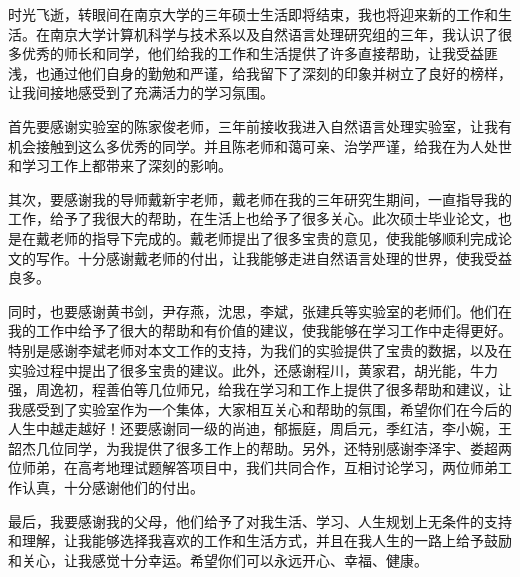 \documentclass[master, winfont]{njuthesis}
\begin{document}
\nocite{*}

%
%
\begin{acknowledgement}
  时光飞逝，转眼间在南京大学的三年硕士生活即将结束，我也将迎来新的工作和生活。在南京大学计算机科学与技术系以及自然语言处理研究组的三年，我认识了很多优秀的师长和同学，他们给我的工作和生活提供了许多直接帮助，让我受益匪浅，也通过他们自身的勤勉和严谨，给我留下了深刻的印象并树立了良好的榜样，让我间接地感受到了充满活力的学习氛围。

  首先要感谢实验室的陈家俊老师，三年前接收我进入自然语言处理实验室，让我有机会接触到这么多优秀的同学。并且陈老师和蔼可亲、治学严谨，给我在为人处世和学习工作上都带来了深刻的影响。
  
  其次，要感谢我的导师戴新宇老师，戴老师在我的三年研究生期间，一直指导我的工作，给予了我很大的帮助，在生活上也给予了很多关心。此次硕士毕业论文，也是在戴老师的指导下完成的。戴老师提出了很多宝贵的意见，使我能够顺利完成论文的写作。十分感谢戴老师的付出，让我能够走进自然语言处理的世界，使我受益良多。

  同时，也要感谢黄书剑，尹存燕，沈思，李斌，张建兵等实验室的老师们。他们在我的工作中给予了很大的帮助和有价值的建议，使我能够在学习工作中走得更好。特别是感谢李斌老师对本文工作的支持，为我们的实验提供了宝贵的数据，以及在实验过程中提出了很多宝贵的建议。此外，还感谢程川，黄家君，胡光能，牛力强，周逸初，程善伯等几位师兄，给我在学习和工作上提供了很多帮助和建议，让我感受到了实验室作为一个集体，大家相互关心和帮助的氛围，希望你们在今后的人生中越走越好！还要感谢同一级的尚迪，郁振庭，周启元，季红洁，李小婉，王韶杰几位同学，为我提供了很多工作上的帮助。另外，还特别感谢李泽宇、娄超两位师弟，在高考地理试题解答项目中，我们共同合作，互相讨论学习，两位师弟工作认真，十分感谢他们的付出。
  
  最后，我要感谢我的父母，他们给予了对我生活、学习、人生规划上无条件的支持和理解，让我能够选择我喜欢的工作和生活方式，并且在我人生的一路上给予鼓励和关心，让我感觉十分幸运。希望你们可以永远开心、幸福、健康。
   
\end{acknowledgement}
\appendix
\end{document}
